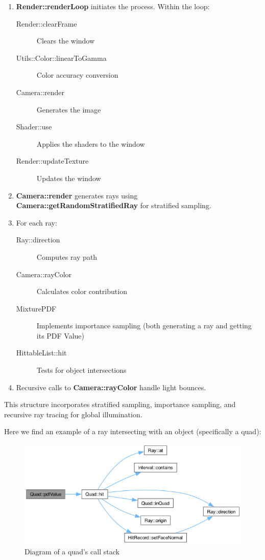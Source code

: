 \documentclass[12pt]{article}
\begin{document}
\begin{enumerate}
    \item \textbf{Render::renderLoop} initiates the process. Within the loop:
          \begin{description}
              \item[Render::clearFrame] Clears the window
              \item[Utils::Color::linearToGamma] Color accuracy conversion
              \item[Camera::render] Generates the image
              \item[Shader::use] Applies the shaders to the window
              \item[Render::updateTexture] Updates the window
          \end{description}

    \item \textbf{Camera::render} generates rays using \textbf{Camera::getRandomStratifiedRay} for stratified sampling.

    \item For each ray:
          \begin{description}
              \item[Ray::direction] Computes ray path
              \item[Camera::rayColor] Calculates color contribution
              \item[MixturePDF] Implements importance sampling (both generating a ray and getting its PDF Value)
              \item[HittableList::hit] Tests for object intersections
          \end{description}

    \item Recursive calls to \textbf{Camera::rayColor} handle light bounces.
\end{enumerate}
This structure incorporates stratified sampling, importance sampling, and recursive ray tracing for global illumination.

Here we find an example of a ray intersecting with an object (specifically a quad):

\begin{figure}[H]
    \centering
    \includegraphics[width=\textwidth]{images/software_architecture/quad_loop_call.png}
    \caption{Diagram of a quad's call stack}
    \label{fig:quadcallstack}
\end{figure}
\end{document}
